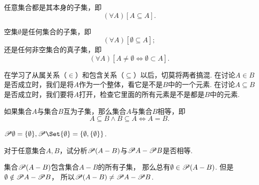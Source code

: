 \begin{theorem}
任意集合都是其本身的子集，即\begin{equation*}
	(\forall A)[A \subseteq A].
\end{equation*}
\end{theorem}

\begin{theorem}
空集\(\emptyset\)是任何集合的子集，即\begin{equation*}
	(\forall A)[\emptyset \subseteq A];
\end{equation*}
还是任何非空集合的真子集，即\begin{equation*}
	(\forall A)[A \neq \emptyset \iff \emptyset \subset A].
\end{equation*}
\end{theorem}

在学习了从属关系（\(\in\)）和包含关系（\(\subseteq\)）以后，切莫将两者搞混.
在讨论\(A \in B\)是否成立时，我们是将\(A\)作为一个整体，看它是不是\(B\)中的一个元素.
在讨论\(A \subseteq B\)是否成立时，我们要将\(A\)打开，检查它里面的所有元素是不是都是\(B\)中的元素.

\begin{theorem}
如果集合\(A\)与集合\(B\)互为子集，那么集合\(A\)与集合\(B\)相等，即\begin{equation*}
	A \subseteq B \land B \subseteq A
	\iff
	A = B.
\end{equation*}
\end{theorem}

\begin{example}
\(\Powerset \emptyset = \{ \emptyset \},%
\Powerset \Set{ \emptyset } = \{ \emptyset, \{ \emptyset \} \}\).
\end{example}

\begin{example}
对于任意集合\(A,B\)，试分析\(\mathscr{P}(A-B)\)与\(\mathscr{P} A - \mathscr{P} B\)是否相等.
\begin{solution}
集合\(\mathscr{P}(A-B)\)包含集合\(A-B\)的所有子集，
那么总有\(\emptyset\in\mathscr{P}(A-B)\).
但是\(\emptyset\notin\mathscr{P} A - \mathscr{P} B\)，
所以\(\mathscr{P}(A-B) \neq \mathscr{P} A - \mathscr{P} B\).
\end{solution}
\end{example}

